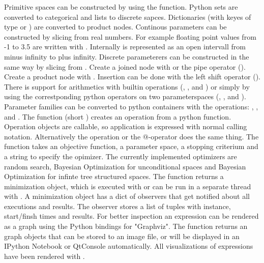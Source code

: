 \documentclass[english]{article}
\begin{document}
Primitive spaces can be constructed by using the  function. Python sets are converted to categorical and lists to discrete sapces. Dictionaries (with keyes of type  or ) are converted to product nodes. Continous parameters can be constructed by slicing from real numbers. For example floating point values from -1 to 3.5 are written with . Internally  is represented as an open intervall from minus infinity to plus infinity. Discrete parameterers can be constructed in the same way by slicing from . Create a joined node with  or the pipe operator (\python{|}). Create a product node with . Insertion can be done with the left shift operator (\python{<<}). There is support for arithmetics with builtin operations (, ,  and ) or simply by using the correstponding python operators on two parameterspaces (\python{+}, \python{-}, \python{*} and \python{/}). Parameter families can be converted to python containers with the operations: , ,  and .
The  function (short ) creates an operation from a python function. Operation objects are callable, so application is expressed with normal calling notation. Alternatively the  operation or the @-operator does the same thing. The  function takes an objective function, a parameter space, a stopping criterium and a string to specify the opimizer.  The currently implemented optimizers are random search, Bayesian Optimization for unconditional spaces and Bayesian Optimization for infinte tree structured spaces. The  function returns a minimization object, which is executed with  or can be run in a separate thread with . A minimization object has a dict of observers that get notified about all executions and results. The  observer stores a list of tuples with instance, start/finsh times and results.
For better inspection an expression can be rendered as a graph using the Python bindings for "Graphviz". The  function returns an graph objects that can be stored to an image file, or will be displayed in an IPython Notebook or QtConsole automatically. All visualizations of expressions have been rendered with .
\end{document}
